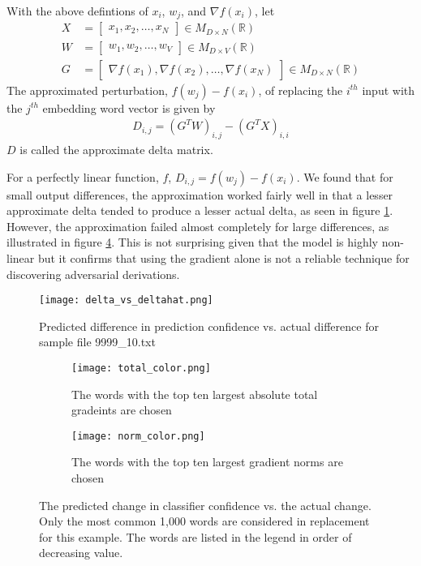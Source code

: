 \begin{definition}

With the above defintions of $x_i$, $w_j$, and $\nabla f(x_i)$, let
\begin{align}
X &= 
\begin{bmatrix}
x_1, x_2, \dots, x_N
\end{bmatrix} \in M_{D\times N}(\mathbb{R})\\
W &= 
\begin{bmatrix}
w_1, w_2, \dots, w_V
\end{bmatrix} \in M_{D\times V}(\mathbb{R})\\
G &= 
\begin{bmatrix}
\nabla f(x_1), \nabla f(x_2), \dots, \nabla f(x_N)
\end{bmatrix} \in M_{D\times N}(\mathbb{R})
\end{align}
\noindent
The approximated perturbation, $f(w_j)-f(x_i)$, of replacing the $i^{th}$ input with the $j^{th}$ embedding word vector is given by 
\begin{align}
    D_{i,j} = (G^TW)_{i,j} - (G^TX)_{i,i}
\end{align}
\noindent
$D$ is called the approximate delta matrix.
\end{definition}
\noindent
For a perfectly linear function, $f$, $D_{i,j} = f(w_j) - f(x_i)$.  We found that for small output differences, the approximation worked fairly well in that a lesser approximate delta tended to produce a lesser actual delta, as seen in figure \ref{fig:dvhat}.  However, the approximation failed almost completely for large differences, as illustrated in figure \ref{fig:outliers}.  This is not surprising given that the model is highly non-linear but it confirms that using the gradient alone is not a reliable technique for discovering adversarial derivations.

\begin{figure}
    \centering
    \texttt{[image: delta\_vs\_deltahat.png]}
    \caption{Predicted difference in prediction confidence vs. actual difference for sample file 9999\_10.txt}
    \label{fig:dvhat}
\end{figure}

\begin{figure}
\centering
\begin{subfigure}[t]{0.45\textwidth}
  \centering
  \texttt{[image: total\_color.png]}
  \caption{The words with the top ten largest absolute total gradeints are chosen}
  \label{fig:total_color}
\end{subfigure}\hfill
\begin{subfigure}[t]{0.45\textwidth}
  \centering
  \texttt{[image: norm\_color.png]}
  \caption{The words with the top ten largest gradient norms are chosen}
  \label{fig:norm_color}
\end{subfigure}
\caption{The predicted change in classifier confidence vs. the actual change.  Only the most common 1,000 words are considered in replacement for this example.  The words are listed in the legend in order of decreasing value.}
\label{fig:outliers}
\end{figure}

